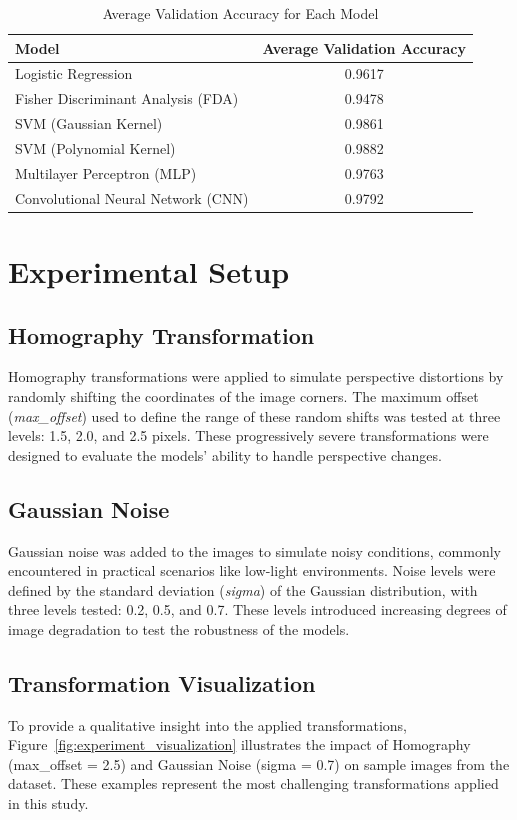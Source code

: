 \documentclass{article}
\begin{document}
\begin{table}[h]
    \centering
    \caption{Average Validation Accuracy for Each Model}
    \label{tab:validation_accuracy}
    \begin{tabular}{l c}
        \toprule
        \textbf{Model} & \textbf{Average Validation Accuracy} \\ 
        \midrule
        Logistic Regression & 0.9617 \\ 
        Fisher Discriminant Analysis (FDA) & 0.9478 \\ 
        SVM (Gaussian Kernel) & 0.9861 \\ 
        SVM (Polynomial Kernel) & 0.9882 \\ 
        Multilayer Perceptron (MLP) & 0.9763 \\ 
        Convolutional Neural Network (CNN) & 0.9792 \\ 
        \bottomrule
    \end{tabular}
\end{table}

\section{Experimental Setup}

\subsection{Homography Transformation}
Homography transformations were applied to simulate perspective distortions by randomly shifting the coordinates of the image corners. The maximum offset (\textit{max\_offset}) used to define the range of these random shifts was tested at three levels: 1.5, 2.0, and 2.5 pixels. These progressively severe transformations were designed to evaluate the models' ability to handle perspective changes.

\subsection{Gaussian Noise}
Gaussian noise was added to the images to simulate noisy conditions, commonly encountered in practical scenarios like low-light environments. Noise levels were defined by the standard deviation (\textit{sigma}) of the Gaussian distribution, with three levels tested: 0.2, 0.5, and 0.7. These levels introduced increasing degrees of image degradation to test the robustness of the models.

\subsection{Transformation Visualization}
To provide a qualitative insight into the applied transformations, Figure~\ref{fig:experiment_visualization} illustrates the impact of Homography (max\_offset = 2.5) and Gaussian Noise (sigma = 0.7) on sample images from the dataset. These examples represent the most challenging transformations applied in this study.
\end{document}
